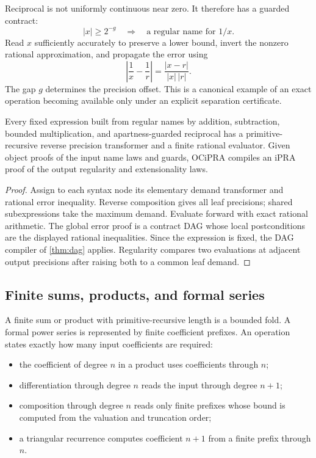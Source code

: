 Reciprocal is not uniformly continuous near zero.  It therefore has a guarded contract:
\[
 |x|\geq 2^{-g}
 \quad\Longrightarrow\quad
 \text{a regular name for }1/x.
\]
Read $x$ sufficiently accurately to preserve a lower bound, invert the nonzero rational approximation, and propagate the error using
\[
 \left|\frac1x-\frac1r\right|
 =\frac{|x-r|}{|x|\,|r|}.
\]
The gap $g$ determines the precision offset.  This is a canonical example of an exact operation becoming available only under an explicit separation certificate.

\begin{proposition}\label{prop:real-dag}
Every fixed expression built from regular names by addition, subtraction, bounded multiplication, and apartness-guarded reciprocal has a primitive-recursive reverse precision transformer and a finite rational evaluator.  Given object proofs of the input name laws and guards, OCiPRA compiles an iPRA proof of the output regularity and extensionality laws.
\end{proposition}

\begin{proof}
Assign to each syntax node its elementary demand transformer and rational error inequality.  Reverse composition gives all leaf precisions; shared subexpressions take the maximum demand.  Evaluate forward with exact rational arithmetic.  The global error proof is a contract DAG whose local postconditions are the displayed rational inequalities.  Since the expression is fixed, the DAG compiler of \cref{thm:dag} applies.  Regularity compares two evaluations at adjacent output precisions after raising both to a common leaf demand.
\end{proof}

\subsection{Finite sums, products, and formal series}

A finite sum or product with primitive-recursive length is a bounded fold.  A formal power series is represented by finite coefficient prefixes.  An operation states exactly how many input coefficients are required:

\begin{itemize}
  \item the coefficient of degree $n$ in a product uses coefficients through $n$;
  \item differentiation through degree $n$ reads the input through degree $n+1$;
  \item composition through degree $n$ reads only finite prefixes whose bound is computed from the valuation and truncation order;
  \item a triangular recurrence computes coefficient $n+1$ from a finite prefix through $n$.
\end{itemize}


